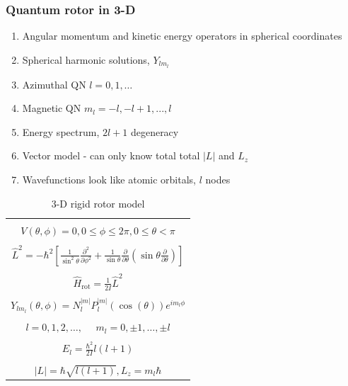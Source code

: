 \documentclass[11pt]{article}
\begin{document}
\subsubsection{Quantum rotor in 3-D}
\label{sec:org40f4faa}
\begin{enumerate}
\item Angular momentum and kinetic energy operators in spherical coordinates
\item Spherical harmonic solutions, \(Y_{lm_l}\)
\item Azimuthal QN \(l=0, 1, \ldots\)
\item Magnetic QN \(m_l = -l, -l+1, ..., l\)
\item Energy spectrum, \(2 l + 1\) degeneracy
\item Vector model - can only know total total \(|L|\) and \(L_z\)
\item Wavefunctions look like atomic orbitals, \(l\) nodes
\end{enumerate}

\begin{table}
   \begin{center}
   \caption{3-D rigid rotor model}
    \label{3-D Rigid rotor}
\begin{tabular}[h]{|c|}
\hline
 \\
$\displaystyle       V(\theta,\phi) = 0, 0 \leq \phi \leq 2\pi, 0 \leq \theta <
\pi$ \\
 \\
$\displaystyle     \hat L^2 = -\hbar^2 \left [
  \frac{1}{\sin^2\theta}\frac{\partial^2}{\partial \phi^2}+\frac{1}{\sin
    \theta}\frac{\partial}{\partial \theta}\left ( \sin \theta
    \frac{\partial}{\partial \theta}\right ) \right ] $ \\
\\
$\displaystyle \hat H_\text{rot} = \frac{1}{2 I} \hat L^2$ \\
\\
$\displaystyle     Y_{lm_l}(\theta,\phi)=N_l^{|m|}P_l^{|m|}(\cos(\theta))e^{im_l\phi}$ \\
\\
$\displaystyle l = 0, 1, 2, \ldots, \ \ \ \ \ \ m_l = 0,\pm 1, \ldots, \pm l$
\\
\\
$\displaystyle     E_{l}=\frac{\hbar^2}{2 I}l(l+1)$ \\
 \\
$\displaystyle |L| = \hbar \sqrt{l(l+1)}, L_z = m_l \hbar $ \\
\hline
\end{tabular}
 \end{center}
\end{table}
\end{document}
